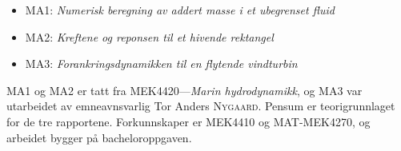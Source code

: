 \begin{itemize}
    \item MA1: \emph{Numerisk beregning av addert masse i et ubegrenset fluid}
    \item MA2: \emph{Kreftene og reponsen til et hivende rektangel}
    \item MA3: \emph{Forankringsdynamikken til en flytende vindturbin}
\end{itemize}
\vspace{3em}
MA1 og MA2 er tatt fra MEK4420---\emph{Marin hydrodynamikk}, og MA3 var utarbeidet av emneavnsvarlig Tor Anders \textsc{Nygaard}.
Pensum er teorigrunnlaget for de tre rapportene.
Forkunnskaper er MEK4410 og MAT-MEK4270, og arbeidet bygger på bacheloroppgaven.
